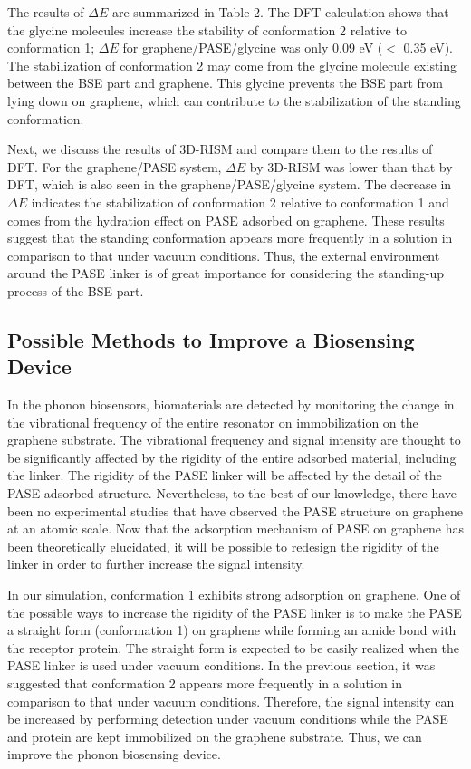 \documentclass[journal=acsodf,manuscript=article]{achemso}
\begin{document}
The results of $\Delta E$ are summarized in Table 2. The DFT calculation shows that the glycine molecules increase the stability of conformation 2 relative to conformation 1; $\Delta E$ for graphene/PASE/glycine was only 0.09 eV ($<$ 0.35 eV). The stabilization of conformation 2 may come from the glycine molecule existing between the BSE part and graphene. This glycine prevents the BSE part from lying down on graphene, which can contribute to the stabilization of the standing conformation.

Next, we discuss the results of 3D-RISM and compare them to the results of DFT. For the graphene/PASE system, $\Delta E$ by 3D-RISM was lower than that by DFT, which is also seen in the graphene/PASE/glycine system. The decrease in $\Delta E$ indicates the stabilization of conformation 2 relative to conformation 1 and comes from the hydration effect on PASE adsorbed on graphene. These results suggest that the standing conformation appears more frequently in a solution in comparison to that under vacuum conditions. Thus, the external environment around the PASE linker is of great importance for considering the standing-up process of the BSE part.

\subsection{Possible Methods to Improve a Biosensing Device}
In the phonon biosensors, biomaterials are detected by monitoring the change in the vibrational frequency of the entire resonator on immobilization on the graphene substrate. The vibrational frequency and signal intensity are thought to be significantly affected by the rigidity of the entire adsorbed material, including the linker. The rigidity of the PASE linker will be affected by the detail of the PASE adsorbed structure.
Nevertheless, to the best of our knowledge, there have been no experimental studies that have observed the PASE structure on graphene at an atomic scale. Now that the adsorption mechanism of PASE on graphene has been theoretically elucidated, it will be possible to redesign the rigidity of the linker in order to further increase the signal intensity.

In our simulation, conformation 1 exhibits strong adsorption on graphene. One of the possible ways to increase the rigidity of the PASE linker is to make the PASE a straight form (conformation 1) on graphene while forming an amide bond with the receptor protein. The straight form is expected to be easily realized when the PASE linker is used under vacuum conditions. In the previous section, it was suggested that conformation 2 appears more frequently in a solution in comparison to that under vacuum conditions. Therefore, the signal intensity can be increased by performing detection under vacuum conditions while the PASE and protein are kept immobilized on the graphene substrate. Thus, we can improve the phonon biosensing device.
\end{document}
